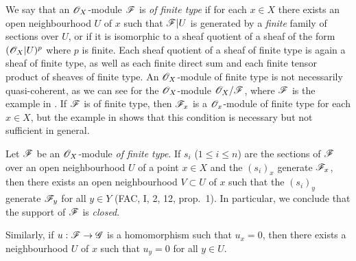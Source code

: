 \begin{env}[5.2.1]
\label{0.5.2.1}
We say that an $\mathscr{O}_X$-module $\mathscr{F}$ is \emph{of finite type} if for each $x\in X$ there exists an open neighbourhood $U$ of $x$ such that $\mathscr{F}|U$ is generated by a \emph{finite} family of sections over $U$, or if it is isomorphic to a sheaf quotient of a sheaf of the form $(\mathscr{O}_X|U)^p$ where $p$ is finite.
Each sheaf quotient of a sheaf of finite type is again a sheaf of finite type, as well as each finite direct sum and each finite tensor product of sheaves of finite type.
An $\mathscr{O}_X$-module of finite type is not necessarily quasi-coherent, as we can see for the $\mathscr{O}_X$-module $\mathscr{O}_X/\mathscr{F}$, where $\mathscr{F}$ is the example in .
If $\mathscr{F}$ is of finite type, then $\mathscr{F}_x$ is a $\mathscr{O}_x$-module of finite type for each $x\in X$, but the example in  shows that this condition is necessary but not sufficient in general.
\end{env}

\begin{env}[5.2.2]
\label{0.5.2.2}
Let $\mathscr{F}$ be an $\mathscr{O}_X$-module \emph{of finite type}.
If $s_i$ ($1\leq i\leq n$) are the sections of $\mathscr{F}$ over an open neighbourhood $U$ of a point $x\in X$ and the $(s_i)_x$ generate $\mathscr{F}_x$, then there exists an open neighbourhood $V\subset U$ of $x$ such that the $(s_i)_y$ generate $\mathscr{F}_y$ for all $y\in Y$ (FAC, I, 2, 12, prop.~1).
In particular, we conclude that the support of $\mathscr{F}$ is \emph{closed}.

Similarly, if $u:\sh{F}\to\sh{G}$ is a homomorphism such that $u_x=0$, then there exists a neighbourhood $U$ of $x$ such that $u_y=0$ for all $y\in U$.
\end{env}


